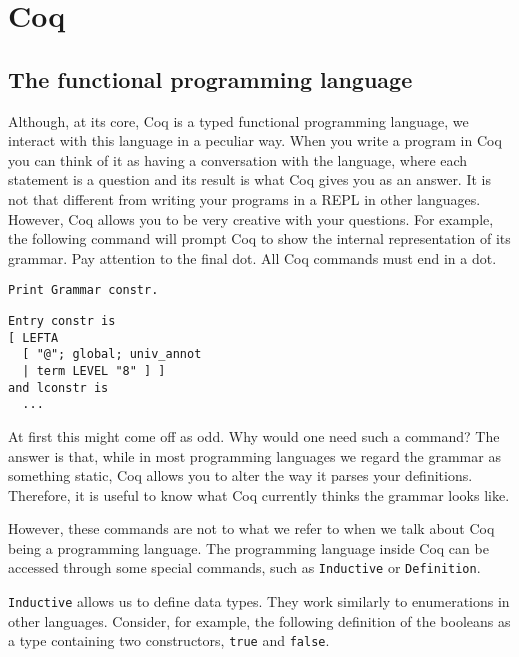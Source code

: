 \chapter{Coq}
\label{cap:coq-proof-assistant}

\section{The functional programming language}
\label{sect:coq-programming-language}

Although, at its core, Coq is a typed functional programming language, we interact with this language
in a peculiar way. When you write a program in Coq you can think of it as having a conversation with the
language, where each statement is a question and its result is what Coq gives you as an answer. It is not
that different from writing your programs in a REPL in other languages. However, Coq  allows you to be
very creative with your questions. For example, the following command will prompt Coq to show the internal
representation of its grammar. Pay attention to the final dot. All Coq commands must end in a dot.


\begin{verbatim}
Print Grammar constr.
\end{verbatim}
\vspace{-\baselineskip*3/2}
\begin{verbatim}
Entry constr is
[ LEFTA
  [ "@"; global; univ_annot
  | term LEVEL "8" ] ]
and lconstr is
  ...
\end{verbatim}

At first this might come off as odd. Why would one need such a command? The answer is that, while in most
programming languages we regard the grammar as something static, Coq allows you to alter the way it parses
your definitions. Therefore, it is useful to know what Coq currently thinks the grammar looks like. 

However, these commands are not to what we refer to when we talk about Coq being a programming language.
The programming language inside Coq can be accessed through some special commands, such as 
\texttt{Inductive} or \texttt{Definition}.

\texttt{Inductive} allows us to define data types. They work similarly to enumerations in other
languages. Consider, for example, the following definition of the booleans as a type containing two 
constructors, \texttt{true} and \texttt{false}.

